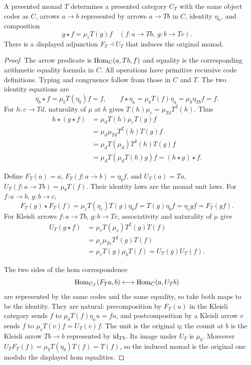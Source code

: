 \begin{theorem}\label{thm:kleisli}
A presented monad $T$ determines a presented category $C_T$ with the same
object codes as $C$, arrows $a\to b$ represented by arrows $a\to Tb$ in
$C$, identity $\eta_a$, and composition
\[
 g\mathbin{\star} f=\mu_cT(g)f
 \quad(f:a\to Tb,\ g:b\to Tc).
\]
There is a displayed adjunction $F_T\dashv U_T$ that induces the original
monad.
\end{theorem}
\begin{proof}
The arrow predicate is $\operatorname{Hom}_C(a,Tb,f)$ and equality is the corresponding
arithmetic equality formula in $C$.  All operations have primitive recursive
code definitions.  Typing and congruence follow from those in $C$ and $T$.
The two identity equations are
\[
 \eta_b\star f=\mu_bT(\eta_b)f=f,
 \qquad
 f\star\eta_a=\mu_bT(f)\eta_a
 =\mu_b\eta_{Tb}f=f.
\]
For $h:c\to Td$, naturality of $\mu$ at $h$ gives
$T(h)\mu_c=\mu_{Td}T^2(h)$.  Thus
\begin{align*}
 h\star(g\star f)
 &=\mu_dT(h)\mu_cT(g)f\\
 &=\mu_d\mu_{Td}T^2(h)T(g)f\\
 &=\mu_dT(\mu_d)T^2(h)T(g)f\\
 &=\mu_dT(\mu_dT(h)g)f=(h\star g)\star f.
\end{align*}

Define $F_T(a)=a$, $F_T(f:a\to b)=\eta_bf$, and
$U_T(a)=Ta$, $U_T(f:a\to Tb)=\mu_bT(f)$.  Their identity laws are the
monad unit laws.  For $f:a\to b$, $g:b\to c$,
\[
 F_T(g)\star F_T(f)
 =\mu_cT(\eta_c)T(g)\eta_bf
 =T(g)\eta_bf=\eta_cgf=F_T(gf).
\]
For Kleisli arrows $f:a\to Tb$, $g:b\to Tc$, associativity and naturality
of $\mu$ give
\begin{align*}
 U_T(g\star f)
 &=\mu_cT(\mu_c)T^2(g)T(f)\\
 &=\mu_c\mu_{Tc}T^2(g)T(f)\\
 &=\mu_cT(g)\mu_bT(f)=U_T(g)U_T(f).
\end{align*}

The two sides of the hom correspondence
\[
 \operatorname{Hom}_{C_T}(F_Ta,b)\longleftrightarrow\operatorname{Hom}_C(a,U_Tb)
\]
are represented by the same codes and the same equality, so take both maps
to be the identity.  They are natural: precomposition by $F_T(u)$ in the
Kleisli category sends $f$ to
$\mu_bT(f)\eta_a u=fu$, and postcomposition by a Kleisli arrow $v$ sends
$f$ to $\mu_cT(v)f=U_T(v)f$.  The unit is the original $\eta$; the counit
at $b$ is the Kleisli arrow $Tb\to b$ represented by $\operatorname{id}_{Tb}$.
Its image under $U_T$ is $\mu_b$.  Moreover
$U_TF_T(f)=\mu_bT(\eta_b)T(f)=T(f)$, so the induced monad is the
original one modulo the displayed hom equalities.
\end{proof}

